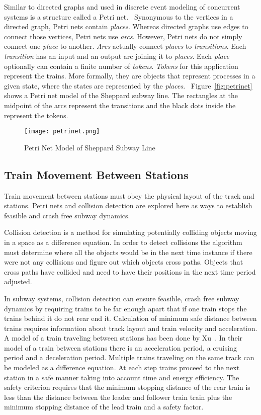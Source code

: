 Similar to directed graphs and used in discrete event modeling of concurrent
systems is a structure called a Petri net.~\cite{Petri62}  Synonymous to the
vertices in a directed graph, Petri nets contain \textit{places}.  Whereas
directed graphs use edges to connect those vertices, Petri nets use
\textit{arcs}. However, Petri nets do not simply connect one \textit{place} to
another.  \textit{Arcs} actually connect \textit{places} to
\textit{transitions}. Each \textit{transition} has an input and an output arc
joining it to \textit{places}.  Each \textit{place} optionally can contain a
finite number of \textit{tokens}.  \textit{Tokens} for this application
represent the trains.  More formally, they are objects that represent processes
in a given state, where the states are represented by the
\textit{places}.~\cite{Kristoffersen2003}  Figure~\ref{fig:petrinet} shows a
Petri net model of the Sheppard subway line. The rectangles at the midpoint of
the arcs represent the transitions and the black dots inside the represent the
tokens.

\begin{figure}[htb]
	\centering
	\texttt{[image: petrinet.png]}
	\caption{Petri Net Model of Sheppard Subway Line}
	\label{fig:directedgraph}
\end{figure}

\subsection{Train Movement Between Stations}

Train movement between stations must obey the physical layout of the track and
stations. Petri nets and collision detection are explored here as ways to
establish feasible and crash free subway dynamics.

Collision detection is a method for simulating potentially colliding objects
moving in a space as a difference equation. In order to detect collisions the
algorithm must determine where all the objects would be in the next time
instance if there were not any collisions and figure out which objects cross
paths. Objects that cross paths have collided and need to have their positions
in the next time period adjusted.

In subway systems, collision detection can ensure feasible, crash free subway
dynamics by requiring trains to be far enough apart that if one train stops the
trains behind it do not rear end it. Calculation of minimum safe distance between
trains requires information about track layout and train velocity and
acceleration. A model of a train traveling between stations has been done by
Xu~\cite{Xu2014}. In their model of a train between stations there is an
acceleration period, a cruising period and a deceleration period. Multiple
trains traveling on the same track can be modeled as a difference equation. At
each step trains proceed to the next station in a safe manner taking into
account time and energy efficiency. The safety criterion requires that the
minimum stopping distance of the rear train is less than the distance between
the leader and follower train train plus the minimum stopping distance of the
lead train and a safety factor. 


